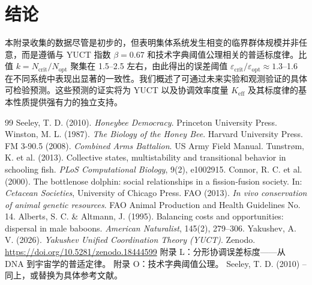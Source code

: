 \documentclass[12pt]{article}
\theoremstyle{remark}
\newcommand{\Keff}{K_{\mathrm{eff}}}
\begin{document}
	\section{结论}
	\label{sec:conclusion}
	
	本附录收集的数据尽管是初步的，但表明集体系统发生相变的临界群体规模并非任意，而是遵循与 YUCT 指数 $\beta = 0.67$ 和技术字典阈值公理相关的普适标度律。比值 $k = N_{\text{crit}}/N_{\text{opt}}$ 聚集在 1.5–2.5 左右，由此得出的误差阈值 $\varepsilon_{\text{crit}}/\varepsilon_{\text{opt}} \approx 1.3$–1.6 在不同系统中表现出显著的一致性。我们概述了可通过未来实验和观测验证的具体可检验预测。这些预测的证实将为 YUCT 以及协调效率度量 $\Keff$ 及其标度律的基本性质提供强有力的独立支持。
	
	\begin{thebibliography}{99}
		 Seeley, T. D. (2010). \emph{Honeybee Democracy}. Princeton University Press.
		 Winston, M. L. (1987). \emph{The Biology of the Honey Bee}. Harvard University Press.
		 FM 3-90.5 (2008). \emph{Combined Arms Battalion}. US Army Field Manual.
		 Tunstrøm, K. et al. (2013). Collective states, multistability and transitional behavior in schooling fish. \emph{PLoS Computational Biology}, 9(2), e1002915.
		 Connor, R. C. et al. (2000). The bottlenose dolphin: social relationships in a fission‑fusion society. In: \emph{Cetacean Societies}, University of Chicago Press.
		 FAO (2013). \emph{In vivo conservation of animal genetic resources}. FAO Animal Production and Health Guidelines No. 14.
		 Alberts, S. C. \& Altmann, J. (1995). Balancing costs and opportunities: dispersal in male baboons. \emph{American Naturalist}, 145(2), 279–306.
		 Yakushev, A. V. (2026). \emph{Yakushev Unified Coordination Theory (YUCT)}. Zenodo. \url{https://doi.org/10.5281/zenodo.18444599}
		 附录 L：分形协调误差标度——从 DNA 到宇宙学的普适定律。
		 附录 O：技术字典阈值公理。
		 Seeley, T. D. (2010) – 同上，或替换为具体参考文献。
	\end{thebibliography}
	
\end{document}
